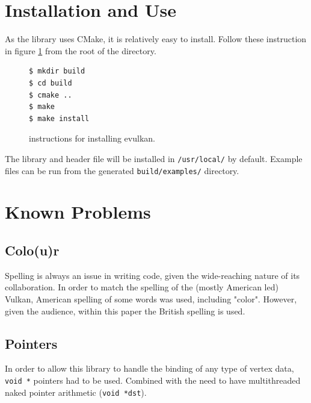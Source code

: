 \documentclass[12pt]{report}
\theoremstyle{definition}
\begin{document}
    \section{Installation and Use}

        As the library uses CMake, it is relatively easy to install. Follow
        these instruction in figure \ref{fig:installation} from the root of the directory.

          \begin{figure}[h!]
            \centering
            \begin{verbatim}
$ mkdir build
$ cd build
$ cmake ..
$ make
$ make install
            \end{verbatim}
            \caption{instructions for installing evulkan.}
            \label{fig:installation}
          \end{figure}

        The library and header file will be installed in \texttt{/usr/local/} by default.
        Example files can be run from the generated \texttt{build/examples/} directory.

        
    \section{Known Problems}

      \subsection{Colo(u)r}

        Spelling is always an issue in writing code, given the wide-reaching
        nature of its collaboration. In order to match the spelling of the
        (mostly American led) Vulkan, American spelling of some words was used,
        including "color". However, given the audience, within this paper the
        British spelling is used.

      \subsection{Pointers}

        In order to allow this library to handle the binding of any type of
        vertex data, \verb|void *| pointers had to be used. Combined with the need to
        have multithreaded naked pointer arithmetic (\verb|void *dst|).
\end{document}
